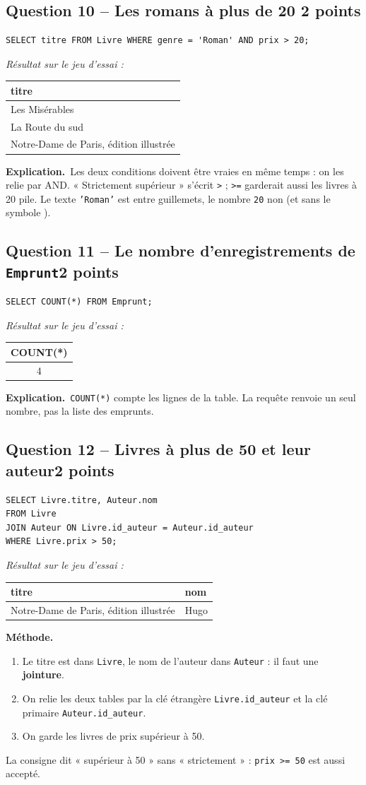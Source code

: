 \documentclass[11pt, a4paper]{exam}
\newcommand{\code}[1]{\texttt{#1}}
\newcommand{\Qt}[2]{\subsection*{#1\hfill{\normalfont\small #2}}}
\newcommand{\methode}{\noindent\textbf{Méthode.}\ }
\newcommand{\explication}{\noindent\textbf{Explication.}\ }
\newcommand{\sql}[1]{\textsc{#1}}
\newcommand{\resultat}[1]{\par\smallskip\noindent\textit{Résultat sur le jeu d'essai :}\par\nopagebreak\begin{center}\small #1\end{center}}
\begin{document}
\Qt{Question 10 -- Les romans à plus de 20 \texteuro}{2 points}
\begin{reponse}
\begin{lstlisting}
SELECT titre FROM Livre WHERE genre = 'Roman' AND prix > 20;
\end{lstlisting}
\end{reponse}
\resultat{\begin{tabular}{|l|}\hline titre \\\hline Les Misérables \\ La Route du sud \\ Notre-Dame de Paris, édition illustrée \\\hline\end{tabular}}
\explication Les deux conditions doivent être vraies en même temps : on les relie par \sql{AND}. « Strictement supérieur » s'écrit \code{>} ; \code{>=} garderait aussi les livres à 20 \texteuro{} pile. Le texte \code{'Roman'} est entre guillemets, le nombre \code{20} non (et sans le symbole \texteuro).

\Qt{Question 11 -- Le nombre d'enregistrements de \code{Emprunt}}{2 points}
\begin{reponse}
\begin{lstlisting}
SELECT COUNT(*) FROM Emprunt;
\end{lstlisting}
\end{reponse}
\resultat{\begin{tabular}{|c|}\hline COUNT(*) \\\hline 4 \\\hline\end{tabular}}
\explication \code{COUNT(*)} compte les lignes de la table. La requête renvoie un seul nombre, pas la liste des emprunts.

\Qt{Question 12 -- Livres à plus de 50 \texteuro{} et leur auteur}{2 points}
\begin{reponse}
\begin{lstlisting}
SELECT Livre.titre, Auteur.nom
FROM Livre
JOIN Auteur ON Livre.id_auteur = Auteur.id_auteur
WHERE Livre.prix > 50;
\end{lstlisting}
\end{reponse}
\resultat{\begin{tabular}{|l|l|}\hline titre & nom \\\hline Notre-Dame de Paris, édition illustrée & Hugo \\\hline\end{tabular}}
\methode
\begin{enumerate}
\item Le titre est dans \code{Livre}, le nom de l'auteur dans \code{Auteur} : il faut une \textbf{jointure}.
\item On relie les deux tables par la clé étrangère \code{Livre.id\_auteur} et la clé primaire \code{Auteur.id\_auteur}.
\item On garde les livres de prix supérieur à 50.
\end{enumerate}
La consigne dit « supérieur à 50 » sans « strictement » : \code{prix >= 50} est aussi accepté.
\end{document}
